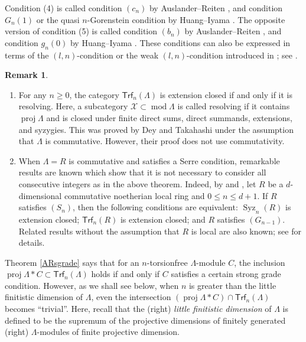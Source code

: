 \documentclass{amsart}
\theoremstyle{definition}
\newtheorem{rmk}[thm]{Remark}
\theoremstyle{remark}
\numberwithin{equation}{thm}
\def\ge{\geqslant}
\def\le{\leqslant}
\def\mod{\operatorname{mod}}
\def\proj{\operatorname{proj}}
\def\Syz{\operatorname{Syz}}
\def\Trf{\mathsf{Trf}}
\def\X{\mathcal{X}}
\begin{document}
Condition (4) is called condition $(c_n)$ by Auslander--Reiten \cite{AR1}, and condition $G_n(1)$ or the quasi $n$-Gorenstein condition by Huang--Iyama \cite{HI}. The opposite version of condition (5) is called condition $(b_n)$ by Auslander--Reiten \cite{AR1}, and condition $g_n(0)$ by Huang--Iyama \cite{HI}. These conditions can also be expressed in terms of the $(l,n)$-condition or the weak $(l,n)$-condition introduced in \cite{IyaSym}; see \cite[5.4]{HI}.

\begin{rmk}\label{exclrmk}
   \begin{enumerate}[\rm(1)]
      \item For any $n\ge0$, the category $\Trf_n(\Lambda)$ is extension closed if and only if it is resolving. Here, a subcategory $\X\subset\mod\Lambda$ is called resolving if it contains $\proj\Lambda$ and is closed under finite direct sums, direct summands, extensions, and syzygies. This was proved by Dey and Takahashi \cite[Proposition 5.1]{DT} under the assumption that $\Lambda$ is commutative. However, their proof does not use commutativity.
      \item When $\Lambda=R$ is commutative and satisfies a Serre condition, remarkable results are known which show that it is not necessary to consider all consecutive integers as in the above theorem. Indeed, by \cite[Theorem B]{GT} and \cite[Proposition 5.1(4)]{DT}, let $R$ be a $d$-dimensional commutative noetherian local ring and $0\le n\le d+1$. If $R$ satisfies $(S_n)$, then the following conditions are equivalent: $\Syz_n(R)$ is extension closed; $\Trf_n(R)$ is extension closed; and $R$ satisfies $(G_{n-1})$. Related results without the assumption that $R$ is local are also known; see \cite{DT,GT,MTT} for details.
   \end{enumerate}
\end{rmk}

Theorem \ref{ARsgrade} says that for an $n$-torsionfree $\Lambda$-module $C$, the inclusion $\proj\Lambda\ast C\subset\Trf_n(\Lambda)$ holds if and only if $C$ satisfies a certain strong grade condition. However, as we shall see below, when $n$ is greater than the little finitistic dimension of $\Lambda$, even the intersection $(\proj\Lambda\ast C)\cap\Trf_n(\Lambda)$ becomes ``trivial''. Here, recall that the (right) {\em little finitistic dimension} of $\Lambda$ is defined to be the supremum of the projective dimensions of finitely generated (right) $\Lambda$-modules of finite projective dimension.
\end{document}
